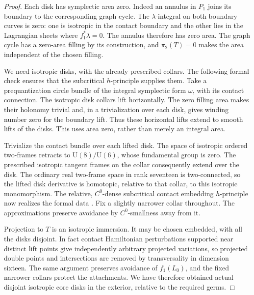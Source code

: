 \begin{proof}
Each disk has symplectic area zero.  Indeed an annulus in $P_1$
joins its boundary to the corresponding graph cycle.  The
$\lambda$-integral on both boundary curves is zero: one is
isotropic in the contact boundary and the other lies in the
Lagrangian sheets where $f_1^*\lambda=0$.  The annulus therefore
has zero area.  The graph cycle has a zero-area filling by its
construction, and $\pi_2(T)=0$ makes the area independent of
the chosen filling.

We need isotropic disks, with the already prescribed collars.
The following formal check ensures that the subcritical
$h$-principle supplies them.  Take a prequantization circle bundle
of the integral symplectic form $\omega$, with its contact
connection.  The isotropic disk collars lift horizontally.  The
zero filling area makes their holonomy trivial and, in a
trivialization over each disk, gives winding number zero for the
boundary lift.  Thus these horizontal lifts extend to smooth
lifts of the disks.  This uses area zero, rather than merely an
integral area.

Trivialize the contact bundle over each lifted disk.  The space
of isotropic ordered two-frames retracts to $\mathrm U(8)/\mathrm
U(6)$, whose fundamental group is zero.  The prescribed
isotropic tangent frames on the collar consequently extend
over the disk.  The ordinary real two-frame space in rank
seventeen is two-connected, so the lifted disk derivative is
homotopic, relative to that collar, to this isotropic
monomorphism.  The relative, $C^0$-dense subcritical contact
embedding $h$-principle now realizes the formal data
\cite[Theorem~12.4.1]{gromov-flexibility}.  Fix a slightly narrower collar
throughout.  The approximations preserve avoidance by
$C^0$-smallness away from it.

Projection to $T$ is an isotropic immersion.  It may be chosen
embedded, with all the disks disjoint.  In fact contact
Hamiltonian perturbations supported near distinct lift points
give independently arbitrary projected variations, so projected
double points and intersections are removed by transversality
in dimension sixteen.  The same argument preserves avoidance
of $f_1(L_0)$, and the fixed narrower collars protect the
attachments.  We have therefore obtained actual disjoint
isotropic core disks in the exterior, relative to the required
germs.


\end{proof}
